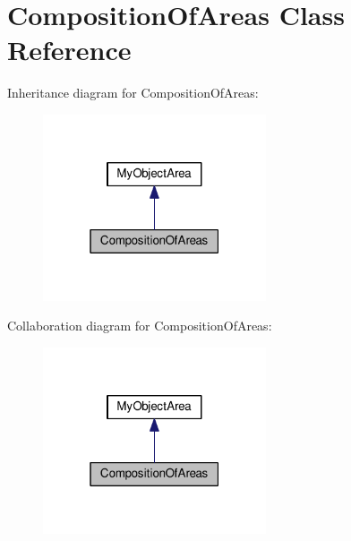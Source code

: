 \hypertarget{class_composition_of_areas}{}\section{Composition\+Of\+Areas Class Reference}
\label{class_composition_of_areas}


Inheritance diagram for Composition\+Of\+Areas\+:
\nopagebreak
\begin{figure}[H]
\begin{center}
\leavevmode
\includegraphics[width=187pt]{class_composition_of_areas__inherit__graph}
\end{center}
\end{figure}


Collaboration diagram for Composition\+Of\+Areas\+:
\nopagebreak
\begin{figure}[H]
\begin{center}
\leavevmode
\includegraphics[width=187pt]{class_composition_of_areas__coll__graph}
\end{center}
\end{figure}
